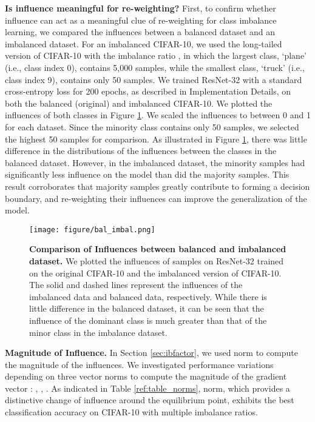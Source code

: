 \textbf{Is influence meaningful for re-weighting?}
First, to confirm whether influence can act as a meaningful clue of re-weighting for class imbalance learning, we compared the influences between a balanced dataset and an imbalanced dataset.
For an imbalanced CIFAR-10, we used the long-tailed version of CIFAR-10 with the imbalance ratio , in which
the largest class, `plane' (i.e., class index 0), contains 5,000 samples, while the smallest class, `truck' (i.e., class index 9), contains only 50 samples.
We trained ResNet-32 with a standard cross-entropy loss for 200 epochs, as described in Implementation Details, on both the balanced (original) and imbalanced CIFAR-10.
We plotted the influences of both classes in Figure \ref{fig:bal_imbal}.
We scaled the influences to between 0 and 1 for each dataset. 
Since the minority class contains only 50 samples, we selected the highest 50 samples for comparison. 
As illustrated in Figure \ref{fig:bal_imbal}, there was little difference in the distributions of the influences between the classes in the balanced dataset.
However, in the imbalanced dataset, the minority samples had significantly less influence on the model than did the majority samples.
This result corroborates that majority samples greatly contribute to forming a decision boundary, and re-weighting their influences can improve the generalization of the model.

\begin{figure}[t]
\begin{center}
\texttt{[image: figure/bal\_imbal.png]}
\caption{\textbf{Comparison of Influences between balanced and imbalanced dataset.}
We plotted the influences of samples on ResNet-32 trained on the original CIFAR-10 and the imbalanced version of CIFAR-10. The solid and dashed lines represent the influences of the imbalanced data and balanced data, respectively.
While there is little difference in the balanced dataset, it can be seen that the influence of the dominant class is much greater than that of the minor class in the imbalance dataset.
} \label{fig:bal_imbal}
\end{center}
\end{figure}


\textbf{Magnitude of Influence.}
In Section \ref{sec:ibfactor}, we used  norm to compute the magnitude of the influences.
We investigated performance variations depending on three vector norms to compute the magnitude of the gradient vector : , , .
As indicated in Table \ref{ref:table_norms},  norm, which provides a distinctive change of influence around the equilibrium point, exhibits the best classification accuracy on CIFAR-10 with multiple imbalance ratios.



